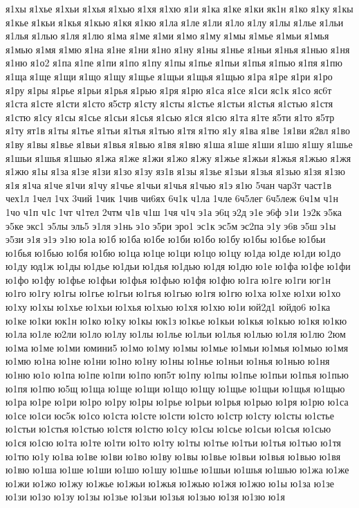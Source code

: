 {я1хы
я1хье
я1хьи
я1хья
я1хью
я1хя
я1хю
я1и
я1ка
я1ке
я1ки
як1н
я1ко
я1ку
я1кы
я1кье
я1кьи
я1кья
я1кью
я1кя
я1кю
я1ла
я1ле
я1ли
я1ло
я1лу
я1лы
я1лье
я1льи
я1лья
я1лью
я1ля
я1лю
я1ма
я1ме
я1ми
я1мо
я1му
я1мы
я1мье
я1мьи
я1мья
я1мью
я1мя
я1мю
я1на
я1не
я1ни
я1но
я1ну
я1ны
я1нье
я1ньи
я1нья
я1нью
я1ня
я1ню
я1о2
я1па
я1пе
я1пи
я1по
я1пу
я1пы
я1пье
я1пьи
я1пья
я1пью
я1пя
я1пю
я1ща
я1ще
я1щи
я1що
я1щу
я1щье
я1щьи
я1щья
я1щью
я1ра
я1ре
я1ри
я1ро
я1ру
я1ры
я1рье
я1рьи
я1рья
я1рью
я1ря
я1рю
я1са
я1се
я1си
яс1к
я1со
яс6т
я1ста
я1сте
я1сти
я1сто
я5стр
я1сту
я1сты
я1стье
я1стьи
я1стья
я1стью
я1стя
я1стю
я1су
я1сы
я1сье
я1сьи
я1сья
я1сью
я1ся
я1сю
я1та
я1те
я5ти
я1то
я5тр
я1ту
ят1в
я1ты
я1тье
я1тьи
я1тья
я1тью
я1тя
я1тю
я1у
я1ва
я1ве
1я1ви
я2вл
я1во
я1ву
я1вы
я1вье
я1вьи
я1вья
я1вью
я1вя
я1вю
я1ша
я1ше
я1ши
я1шо
я1шу
я1шье
я1шьи
я1шья
я1шью
я1жа
я1же
я1жи
я1жо
я1жу
я1жье
я1жьи
я1жья
я1жью
я1жя
я1жю
я1ы
я1за
я1зе
я1зи
я1зо
я1зу
яз1в
я1зы
я1зье
я1зьи
я1зья
я1зью
я1зя
я1зю
я1я
я1ча
я1че
я1чи
я1чу
я1чье
я1чьи
я1чья
я1чью
я1э
я1ю
5чан
чар3т
част1в
чех1л
1чел
1чх
3чий
1чик
1чив
чи6ях
6ч1к
ч1ла
1чле
6ч5лег
6ч5леж
6ч1м
ч1н
1чо
ч1п
ч1с
1чт
ч1тел
2чтм
ч1в
ч1ш
1чя
ч1ч
э1а
э6ц
э2д
э1е
э6ф
э1и
1э2к
э5ка
э5ке
экс1
э5лы
эль5
э1ля
э1нь
э1о
э5ри
эро1
эс1к
эс5м
эс2па
э1у
э6в
э5ш
э1ы
э5зи
э1я
э1э
э1ю
ю1а
ю1б
ю1ба
ю1бе
ю1би
ю1бо
ю1бу
ю1бы
ю1бье
ю1бьи
ю1бья
ю1бью
ю1бя
ю1бю
ю1ца
ю1це
ю1ци
ю1цо
ю1цу
ю1да
ю1де
ю1ди
ю1до
ю1ду
юд1ж
ю1ды
ю1дье
ю1дьи
ю1дья
ю1дью
ю1дя
ю1дю
ю1е
ю1фа
ю1фе
ю1фи
ю1фо
ю1фу
ю1фье
ю1фьи
ю1фья
ю1фью
ю1фя
ю1фю
ю1га
ю1ге
ю1ги
юг1н
ю1го
ю1гу
ю1гы
ю1гье
ю1гьи
ю1гья
ю1гью
ю1гя
ю1гю
ю1ха
ю1хе
ю1хи
ю1хо
ю1ху
ю1хы
ю1хье
ю1хьи
ю1хья
ю1хью
ю1хя
ю1хю
ю1и
юй2д1
юйдо6
ю1ка
ю1ке
ю1ки
юк1н
ю1ко
ю1ку
ю1кы
юк1з
ю1кье
ю1кьи
ю1кья
ю1кью
ю1кя
ю1кю
ю1ла
ю1ле
ю2ли
ю1ло
ю1лу
ю1лы
ю1лье
ю1льи
ю1лья
ю1лью
ю1ля
ю1лю
2юм
ю1ма
ю1ме
ю1ми
юмини5
ю1мо
ю1му
ю1мы
ю1мье
ю1мьи
ю1мья
ю1мью
ю1мя
ю1мю
ю1на
ю1не
ю1ни
ю1но
ю1ну
ю1ны
ю1нье
ю1ньи
ю1нья
ю1нью
ю1ня
ю1ню
ю1о
ю1па
ю1пе
ю1пи
ю1по
юп5т
ю1пу
ю1пы
ю1пье
ю1пьи
ю1пья
ю1пью
ю1пя
ю1пю
ю5щ
ю1ща
ю1ще
ю1щи
ю1що
ю1щу
ю1щье
ю1щьи
ю1щья
ю1щью
ю1ра
ю1ре
ю1ри
ю1ро
ю1ру
ю1ры
ю1рье
ю1рьи
ю1рья
ю1рью
ю1ря
ю1рю
ю1са
ю1се
ю1си
юс5к
ю1со
ю1ста
ю1сте
ю1сти
ю1сто
ю1стр
ю1сту
ю1сты
ю1стье
ю1стьи
ю1стья
ю1стью
ю1стя
ю1стю
ю1су
ю1сы
ю1сье
ю1сьи
ю1сья
ю1сью
ю1ся
ю1сю
ю1та
ю1те
ю1ти
ю1то
ю1ту
ю1ты
ю1тье
ю1тьи
ю1тья
ю1тью
ю1тя
ю1тю
ю1у
ю1ва
ю1ве
ю1ви
ю1во
ю1ву
ю1вы
ю1вье
ю1вьи
ю1вья
ю1вью
ю1вя
ю1вю
ю1ша
ю1ше
ю1ши
ю1шо
ю1шу
ю1шье
ю1шьи
ю1шья
ю1шью
ю1жа
ю1же
ю1жи
ю1жо
ю1жу
ю1жье
ю1жьи
ю1жья
ю1жью
ю1жя
ю1жю
ю1ы
ю1за
ю1зе
ю1зи
ю1зо
ю1зу
ю1зы
ю1зье
ю1зьи
ю1зья
ю1зью
ю1зя
ю1зю
ю1я
}
